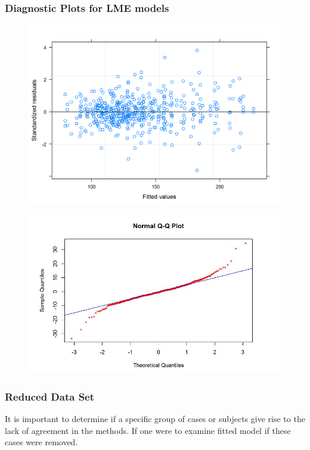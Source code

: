 \documentclass[12pt, a4paper]{report}
\theoremstyle{plain}
\theoremstyle{definition}
\theoremstyle{remark}
\begin{document}
	
	
	\newpage	
	\subsubsection{Diagnostic Plots for LME models}
	
	
	
	
	
	\begin{figure}[h!]
		\centering
		\includegraphics[width=0.9\linewidth]{images/ResidPlot1}
		\caption{}
		\label{fig:ResidPlot1}
	\end{figure}
	
	
	
	\begin{figure}[h!]
		\centering
		\includegraphics[width=0.7\linewidth]{images/Resid-newplot}
		\caption{}
		\label{fig:Resid-newplot}
	\end{figure}
	
	
	
	
	\subsubsection{Reduced Data Set}
	It is important to determine if a specific group of cases or subjects give rise to the lack of agreement in the methods. If one were to examine fitted model if these cases were removed.
	
\end{document}
